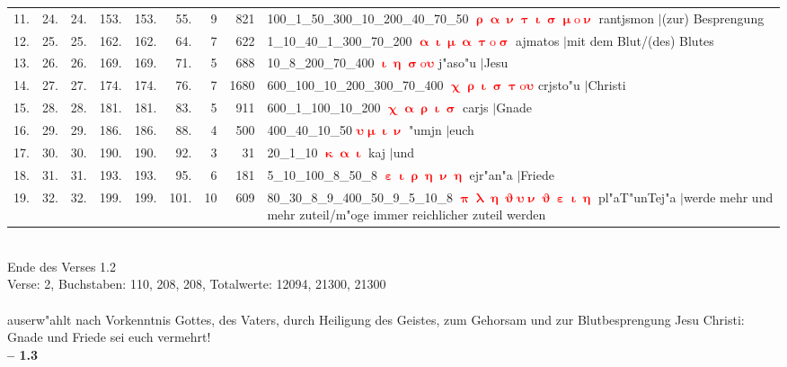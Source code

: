 \documentclass[a4paper,10pt,landscape]{article}
\begin{document}
\begin{tabular}{rrrrrrrrp{120mm}}
11.&24.&24.&153.&153.&55.&9&821&100\_1\_50\_300\_10\_200\_40\_70\_50 \textcolor{red}{$\boldsymbol{\uprho\upalpha\upnu\uptau\upiota\upsigma\upmu\mathrm{o}\upnu}$} rantjsmon $|$(zur) Besprengung\\
12.&25.&25.&162.&162.&64.&7&622&1\_10\_40\_1\_300\_70\_200 \textcolor{red}{$\boldsymbol{\upalpha\upiota\upmu\upalpha\uptau\mathrm{o}\upsigma}$} ajmatos $|$mit dem Blut/(des) Blutes\\
13.&26.&26.&169.&169.&71.&5&688&10\_8\_200\_70\_400 \textcolor{red}{$\boldsymbol{\upiota\upeta\upsigma\mathrm{o}\upsilon}$} j"aso"u $|$Jesu\\
14.&27.&27.&174.&174.&76.&7&1680&600\_100\_10\_200\_300\_70\_400 \textcolor{red}{$\boldsymbol{\upchi\uprho\upiota\upsigma\uptau\mathrm{o}\upsilon}$} crjsto"u $|$Christi\\
15.&28.&28.&181.&181.&83.&5&911&600\_1\_100\_10\_200 \textcolor{red}{$\boldsymbol{\upchi\upalpha\uprho\upiota\upsigma}$} carjs $|$Gnade\\
16.&29.&29.&186.&186.&88.&4&500&400\_40\_10\_50 \textcolor{red}{$\boldsymbol{\upsilon\upmu\upiota\upnu}$} "umjn $|$euch\\
17.&30.&30.&190.&190.&92.&3&31&20\_1\_10 \textcolor{red}{$\boldsymbol{\upkappa\upalpha\upiota}$} kaj $|$und\\
18.&31.&31.&193.&193.&95.&6&181&5\_10\_100\_8\_50\_8 \textcolor{red}{$\boldsymbol{\upepsilon\upiota\uprho\upeta\upnu\upeta}$} ejr"an"a $|$Friede\\
19.&32.&32.&199.&199.&101.&10&609&80\_30\_8\_9\_400\_50\_9\_5\_10\_8 \textcolor{red}{$\boldsymbol{\uppi\uplambda\upeta\upvartheta\upsilon\upnu\upvartheta\upepsilon\upiota\upeta}$} pl"aT"unTej"a $|$werde mehr und mehr zuteil/m"oge immer reichlicher zuteil werden\\
\end{tabular}\medskip \\
Ende des Verses 1.2\\
Verse: 2, Buchstaben: 110, 208, 208, Totalwerte: 12094, 21300, 21300\\
\\
auserw"ahlt nach Vorkenntnis Gottes, des Vaters, durch Heiligung des Geistes, zum Gehorsam und zur Blutbesprengung Jesu Christi: Gnade und Friede sei euch vermehrt!\\
\newpage 
{\bf -- 1.3}\\
\medskip \\
\end{document}
